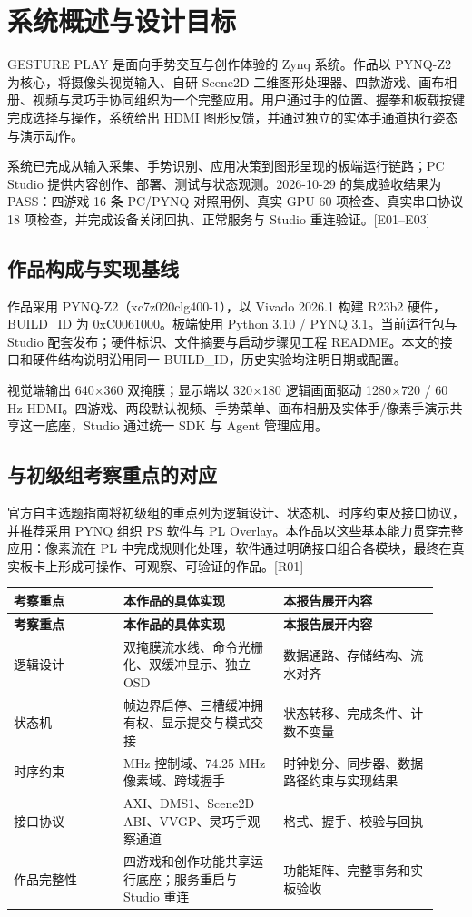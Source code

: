 \section{系统概述与设计目标}
GESTURE PLAY 是面向手势交互与创作体验的 Zynq 系统。作品以 PYNQ-Z2 为核心，将摄像头视觉输入、自研 Scene2D 二维图形处理器、四款游戏、画布相册、视频与灵巧手协同组织为一个完整应用。用户通过手的位置、握拳和板载按键完成选择与操作，系统给出 HDMI 图形反馈，并通过独立的实体手通道执行姿态与演示动作。

系统已完成从输入采集、手势识别、应用决策到图形呈现的板端运行链路；PC Studio 提供内容创作、部署、测试与状态观测。2026-10-29 的集成验收结果为 PASS：四游戏 16 条 PC/PYNQ 对照用例、真实 GPU 60 项检查、真实串口协议 18 项检查，并完成设备关闭回执、正常服务与 Studio 重连验证。[E01–E03]

\subsection{作品构成与实现基线}
作品采用 PYNQ-Z2（xc7z020clg400-1），以 Vivado 2026.1 构建 R23b2 硬件，BUILD\_ID 为 0xC0061000。板端使用 Python 3.10 / PYNQ 3.1。当前运行包与 Studio 配套发布；硬件标识、文件摘要与启动步骤见工程 README。本文的接口和硬件结构说明沿用同一 BUILD\_ID，历史实验均注明日期或配置。

视觉端输出 640×360 双掩膜；显示端以 320×180 逻辑画面驱动 1280×720 / 60 Hz HDMI。四游戏、两段默认视频、手势菜单、画布相册及实体手/像素手演示共享这一底座，Studio 通过统一 SDK 与 Agent 管理应用。

\subsection{与初级组考察重点的对应}
官方自主选题指南将初级组的重点列为逻辑设计、状态机、时序约束及接口协议，并推荐采用 PYNQ 组织 PS 软件与 PL Overlay。本作品以这些基本能力贯穿完整应用：像素流在 PL 中完成规则化处理，软件通过明确接口组合各模块，最终在真实板卡上形成可操作、可观察、可验证的作品。[R01]

{\small\renewcommand{\arraystretch}{1.28}
\begin{longtable}{@{}>{\raggedright\arraybackslash}p{0.24\linewidth}>{\raggedright\arraybackslash}p{0.35\linewidth}>{\raggedright\arraybackslash}p{0.34\linewidth}@{}}
\toprule
\bfseries 考察重点 & \bfseries 本作品的具体实现 & \bfseries 本报告展开内容\\\midrule
\endfirsthead
\toprule
\bfseries 考察重点 & \bfseries 本作品的具体实现 & \bfseries 本报告展开内容\\\midrule
\endhead
\bottomrule\endfoot
逻辑设计 & 双掩膜流水线、命令光栅化、双缓冲显示、独立 OSD & 数据通路、存储结构、流水对齐\\
状态机 & 帧边界启停、三槽缓冲拥有权、显示提交与模式交接 & 状态转移、完成条件、计数不变量\\
时序约束 & 100 MHz 控制域、74.25 MHz 像素域、跨域握手 & 时钟划分、同步器、数据路径约束与实现结果\\
接口协议 & AXI、DMS1、Scene2D ABI、VVGP、灵巧手观察通道 & 格式、握手、校验与回执\\
作品完整性 & 四游戏和创作功能共享运行底座；服务重启与 Studio 重连 & 功能矩阵、完整事务和实板验收\\
\end{longtable}}
\clearpage
